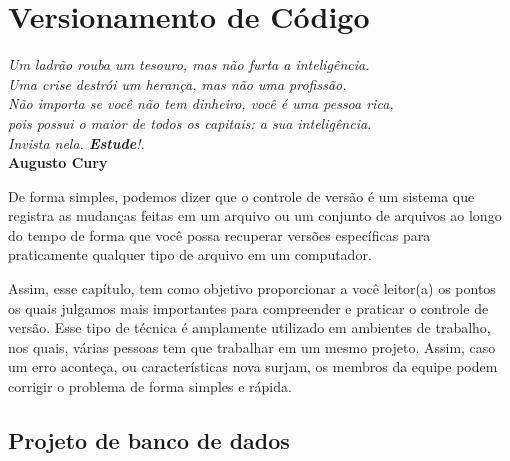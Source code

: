 \chapter{Versionamento de Código}\label{cap:cap3}

\begin{flushright}
	\textit{
		Um ladrão rouba um tesouro, mas não furta a inteligência. \\
		Uma crise destrói um herança, mas não uma profissão. \\ Não importa se você não tem dinheiro, você é uma pessoa rica, \\ pois possui o maior de todos os capitais: a sua inteligência. \\ Invista nela. \textbf{Estude}!.
	} \\
	
	\textbf{Augusto Cury}
\end{flushright}

De forma simples, podemos dizer que o controle de versão é um sistema que registra as mudanças feitas em um arquivo ou um conjunto de arquivos ao longo do tempo de forma que você possa recuperar versões específicas para praticamente qualquer tipo de arquivo em um computador. 

Assim, esse capítulo, tem como objetivo proporcionar a você leitor(a) os pontos os quais julgamos mais importantes para compreender e praticar o controle de versão. Esse tipo de técnica é amplamente utilizado em ambientes de trabalho, nos quais, várias pessoas tem que trabalhar em um mesmo projeto. Assim, caso um erro aconteça, ou características nova surjam, os membros da equipe podem corrigir o problema de forma simples e rápida.  

\section{Projeto de banco de dados}


